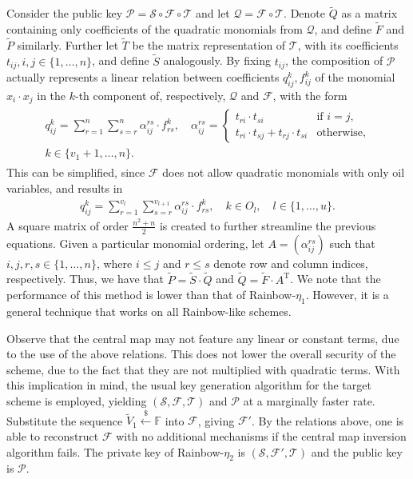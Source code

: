 \documentclass[openright, draft, 10pt]{report}
\newcommand{\random}{\stackrel{\$}{\longleftarrow}}
\begin{document}
Consider the public key
$\mathcal{P} = \mathcal{S} \circ \mathcal{F} \circ \mathcal{T}$ and let
$\mathcal{Q} = \mathcal{F} \circ \mathcal{T}$. Denote $\widetilde{Q}$ as a
matrix containing only coefficients of the quadratic monomials from
$\mathcal{Q}$, and define $\widetilde{F}$ and $\widetilde{P}$ similarly.
Further let $\widetilde{T}$ be the matrix representation of $\mathcal{T}$, with
its coefficients $t_{ij}, i, j \in \{1, \dots, n\}$, and define $\widetilde{S}$
analogously. By fixing $t_{ij}$, the composition of $\mathcal{P}$ actually
represents a linear relation between coefficients $q_{ij}^{k}, f_{ij}^{k}$ of
the monomial $x_{i} \cdot x_{j}$ in the $k$-th component of, respectively,
$\mathcal{Q}$ and $\mathcal{F}$, with the form
\begin{align}
  \begin{split}
    q_{ij}^{k} = \sum_{r = 1}^{n} \sum_{s = r}^{n}
      \alpha_{ij}^{rs} \cdot f_{rs}^{k}, \quad
      \alpha_{ij}^{rs} = \begin{cases}
        t_{ri} \cdot t_{si}                         & \text{if } i = j, \\
        t_{ri} \cdot t_{sj} + t_{rj} \cdot t_{si}   & \text{otherwise},
      \end{cases} \\
      k \in \{v_{1} + 1, \dots, n\}.
  \end{split}
\end{align}
This can be simplified, since $\mathcal{F}$ does not allow quadratic monomials
with only oil variables, and results in
\begin{align}
  q_{ij}^{k} = \sum_{r = 1}^{v_{l}} \sum_{s = r}^{v_{l + 1}}
    \alpha_{ij}^{rs} \cdot f_{rs}^{k},
      \quad k \in O_{l}, \quad l \in \{1, \dots, u\}.
\end{align}
A square matrix of order $\frac{n^{2} + n}{2}$ is created to further streamline
the previous equations. Given a particular monomial ordering, let
$A = (\alpha_{ij}^{rs})$ such that $i, j, r, s \in \{1, \dots, n\}$, where
$i \leq j$ and $r \leq s$ denote row and column indices, respectively. Thus, we
have that $\widetilde{P} = \widetilde{S} \cdot \widetilde{Q}$ and
$\widetilde{Q} = \widetilde{F} \cdot A^{\text{T}}$. We note that the
performance of this method is lower than that of Rainbow-$\eta_{1}$. However,
it is a general technique that works on all Rainbow-like schemes.

Observe that the central map may not feature any linear or constant terms, due
to the use of the above relations. This does not lower the overall security of
the scheme, due to the fact that they are not multiplied with quadratic terms.
With this implication in mind, the usual key generation algorithm for the
target scheme is employed, yielding $(\mathcal{S}, \mathcal{F}, \mathcal{T})$
and $\mathcal{P}$ at a marginally faster rate. Substitute the sequence
$\widetilde{V}_{1} \random{} \mathbb{F}$ into $\mathcal{F}$, giving
$\mathcal{F'}$. By the relations above, one is able to reconstruct
$\mathcal{F}$ with no additional mechanisms if the central map inversion
algorithm fails. The private key of Rainbow-$\eta_{2}$ is
$(\mathcal{S}, \mathcal{F}', \mathcal{T})$ and the public key is $\mathcal{P}$.
\end{document}
